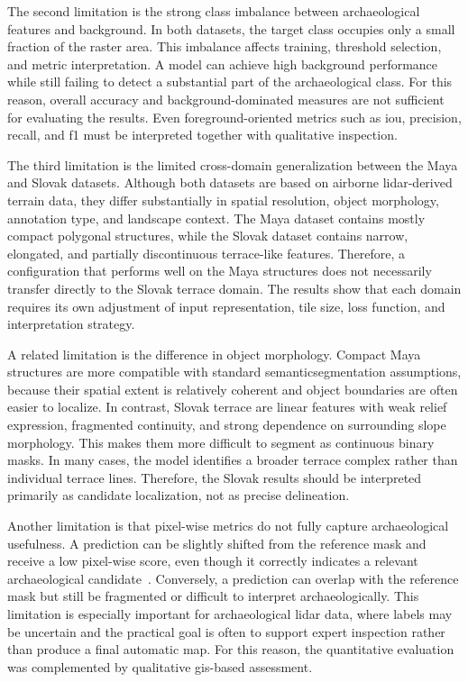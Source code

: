 The second limitation is the strong class imbalance between archaeological features and background. In both datasets, the target class occupies only a small fraction of the raster area. This imbalance affects training, threshold selection, and metric interpretation. A model can achieve high background performance while still failing to detect a substantial part of the archaeological class. For this reason, overall accuracy and background-dominated measures are not sufficient for evaluating the results. Even foreground-oriented metrics such as \gls{iou}, precision, recall, and \gls{f1} must be interpreted together with qualitative inspection.

The third limitation is the limited cross-domain generalization between the Maya and Slovak datasets. Although both datasets are based on airborne \gls{lidar}-derived terrain data, they differ substantially in spatial resolution, object morphology, annotation type, and landscape context. The Maya dataset contains mostly compact polygonal structures, while the Slovak dataset contains narrow, elongated, and partially discontinuous terrace-like features. Therefore, a configuration that performs well on the Maya structures does not necessarily transfer directly to the Slovak terrace domain. The results show that each domain requires its own adjustment of input representation, tile size, loss function, and interpretation strategy.

A related limitation is the difference in object morphology. Compact Maya structures are more compatible with standard \gls{semanticsegmentation} assumptions, because their spatial extent is relatively coherent and object boundaries are often easier to localize. In contrast, Slovak terrace are linear features with weak relief expression, fragmented continuity, and strong dependence on surrounding \gls{slope} morphology. This makes them more difficult to segment as continuous binary masks. In many cases, the model identifies a broader terrace complex rather than individual terrace lines. Therefore, the Slovak results should be interpreted primarily as candidate localization, not as precise delineation.

Another limitation is that pixel-wise metrics do not fully capture archaeological usefulness. A prediction can be slightly shifted from the reference mask and receive a low pixel-wise score, even though it correctly indicates a relevant archaeological candidate~\cite{fiorucci_deep_2022}. Conversely, a prediction can overlap with the reference mask but still be fragmented or difficult to interpret archaeologically. This limitation is especially important for archaeological \gls{lidar} data, where labels may be uncertain and the practical goal is often to support expert inspection rather than produce a final automatic map. For this reason, the quantitative evaluation was complemented by qualitative \gls{gis}-based assessment.

